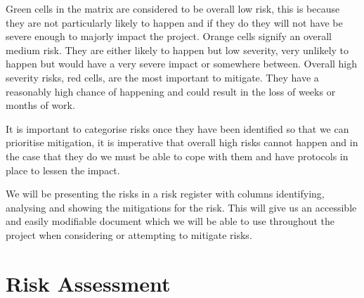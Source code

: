 \documentclass{report}   	%
\begin{document}
Green cells in the matrix are considered to be overall low risk, this is because they are not particularly likely to happen and if they do they will not have be severe enough to majorly impact the project.
Orange cells signify an overall medium risk.
They are either likely to happen but low severity, very unlikely to happen but would have a very severe impact or somewhere between.
Overall high severity risks, red cells, are the most important to mitigate.
They have a reasonably high chance of happening and could result in the loss of weeks or months of work.

It is important to categorise risks once they have been identified so that we can prioritise mitigation, it is imperative that overall high risks cannot happen and in the case that they do we must be able to cope with them and have protocols in place to lessen the impact.

We will be presenting the risks in a risk register with columns identifying, analysing and showing the mitigations for the risk.
This will give us an accessible and easily modifiable document which we will be able to use throughout the project when considering or attempting to mitigate risks.

\newpage
\section{Risk Assessment}
\end{document}
